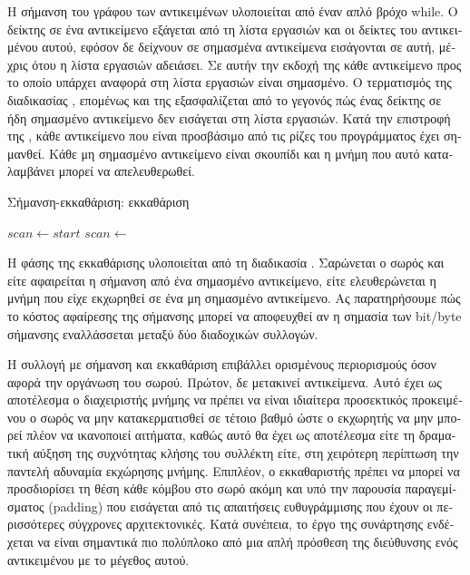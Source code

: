 \begin{greek}
Η σήμανση του γράφου των αντικειμένων υλοποιείται από έναν 
απλό βρόχο while. Ο δείκτης σε ένα αντικείμενο εξάγεται από 
τη λίστα εργασιών και οι δείκτες του αντικειμένου αυτού, 
εφόσον δε δείχνουν σε σημασμένα αντικείμενα εισάγονται σε 
αυτή, μέχρις ότου η λίστα εργασιών αδειάσει. Σε αυτήν την
εκδοχή της \textenglish{} κάθε αντικείμενο προς το οποίο
υπάρχει αναφορά στη λίστα εργασιών είναι σημασμένο. 
Ο τερματισμός της διαδικασίας , επομένως και 
της \textenglish{} εξασφαλίζεται από το γεγονός 
πώς ένας δείκτης σε ήδη σημασμένο αντικείμενο δεν εισάγεται 
στη λίστα εργασιών. Κατά την επιστροφή της \textenglish{},
κάθε αντικείμενο που είναι προσβάσιμο από τις ρίζες του 
προγράμματος έχει σημανθεί. Κάθε μη σημασμένο αντικείμενο 
είναι σκουπίδι και η μνήμη που αυτό καταλαμβάνει μπορεί να 
απελευθερωθεί.

\begin{algorithm}
  \caption{Σήμανση-εκκαθάριση: εκκαθάριση}
  \label{alg:mrkswp_3}
  \begin{algorithmic}[1]
      \State $scan \gets start$
          \State {}
        \Else
          \State {}
        \EndIf
        \State $scan \gets$ 
      \EndWhile
    \EndProcedure
  \end{algorithmic}
\end{algorithm}

Η φάσης της εκκαθάρισης υλοποιείται από τη διαδικασία 
\textenglish{}. Σαρώνεται ο σωρός και είτε αφαιρείται η 
σήμανση από ένα σημασμένο αντικείμενο, είτε ελευθερώνεται η 
μνήμη που είχε εκχωρηθεί σε ένα μη σημασμένο αντικείμενο.
Ας παρατηρήσουμε πώς το κόστος αφαίρεσης της σήμανσης μπορεί 
να αποφευχθεί αν η σημασία των bit/byte σήμανσης εναλλάσσεται 
μεταξύ δύο διαδοχικών συλλογών.

Η συλλογή με σήμανση και εκκαθάριση επιβάλλει ορισμένους
περιορισμούς όσον αφορά την οργάνωση του σωρού. Πρώτον, δε
μετακινεί αντικείμενα. Αυτό έχει ως αποτέλεσμα ο διαχειριστής
μνήμης να πρέπει να είναι ιδιαίτερα προσεκτικός προκειμένου ο
σωρός να μην κατακερματισθεί σε τέτοιο βαθμό ώστε ο εκχωρητής
να μην μπορεί πλέον να ικανοποιεί αιτήματα, καθώς αυτό θα έχει
ως αποτέλεσμα είτε τη δραματική αύξηση της συχνότητας κλήσης
του συλλέκτη είτε, στη χειρότερη περίπτωση την παντελή 
αδυναμία εκχώρησης μνήμης. Επιπλέον, ο εκκαθαριστής πρέπει
να μπορεί να προσδιορίσει τη θέση κάθε κόμβου στο σωρό ακόμη
και υπό την παρουσία παραγεμίσματος (padding) που εισάγεται
από τις απαιτήσεις ευθυγράμμισης που έχουν οι περισσότερες
σύγχρονες αρχιτεκτονικές. Κατά συνέπεια, το έργο της 
συνάρτησης \textenglish{} ενδέχεται να είναι σημαντικά
πιο πολύπλοκο από μια απλή πρόσθεση της διεύθυνσης ενός
αντικειμένου με το μέγεθος αυτού.


\end{greek}

